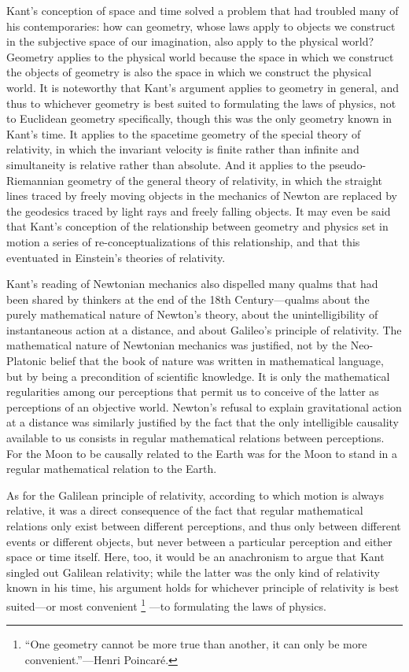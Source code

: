 \documentclass[smallextended]{svjour3}
\begin{document}
Kant's conception of space and time solved a problem that had troubled many of his contemporaries: how can geometry, whose laws apply to objects we construct in the subjective space of our imagination, also apply to the physical world? Geometry applies to the physical world because the space in which we construct the objects of geometry is also the space in which we construct the physical world. It is noteworthy that Kant's argument  applies to geometry in general, and thus to whichever geometry is best suited to formulating the laws of physics, not to Euclidean geometry specifically, though this was the only geometry known in Kant's time. It applies to the spacetime geometry of the special theory of relativity, in which the invariant velocity is finite rather than infinite and simultaneity is relative rather than absolute. And it applies to the pseudo-Riemannian geometry of the general theory of relativity, in which the straight lines traced by freely moving objects in the mechanics of Newton are replaced by the geodesics traced by light rays and freely falling objects. It may even be said that Kant's conception of the relationship between geometry and physics set in motion a series of re-conceptualizations of this relationship, and that this eventuated in Einstein's theories of relativity.\cite{Friedman2009}

Kant's reading of Newtonian mechanics also dispelled many qualms that had been shared by thinkers at the end of the 18th Century---qualms about the purely mathematical nature of Newton's theory, about the unintelligibility of instantaneous action at a distance, and about Galileo's principle of relativity. The mathematical nature of Newtonian mechanics was justified, not by the Neo-Platonic belief that the book of nature was written in mathematical language, but by being a precondition of scientific knowledge. It is only the mathematical regularities among our perceptions that permit us to conceive of the latter as perceptions of an objective world. Newton's refusal to explain gravitational action at a distance was similarly justified by the fact that the only intelligible causality available to us consists in regular mathematical relations between perceptions. For the Moon to be causally related to the Earth was for the Moon to stand in a regular mathematical relation to the Earth. 

As for the Galilean principle of relativity, according to which motion is always relative, it was a direct consequence of the fact that regular mathematical relations only exist between different perceptions, and thus only between different events or different objects, but never between a particular perception and either space or time itself. Here, too, it would be an anachronism to argue that Kant singled out Galilean relativity; while the latter was the only kind of relativity known in his time, his argument holds for whichever principle of relativity is best suited---or most convenient%
\footnote{``One geometry cannot be more true than another, it can only be more convenient.''---Henri Poincar\'e.\cite{Poincare1905}}%
---to formulating the laws of physics.
\end{document}
